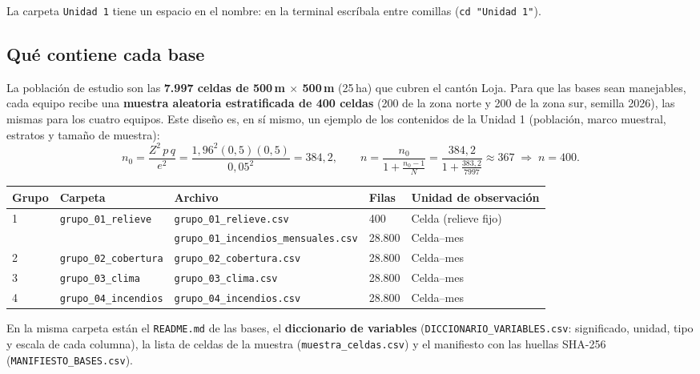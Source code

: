 \documentclass[11pt,a4paper]{article}
\begin{document}
La carpeta \texttt{Unidad 1} tiene un espacio en el nombre: en la terminal escríbala entre comillas (\texttt{cd "Unidad 1"}).

\subsection{Qué contiene cada base}

La población de estudio son las \textbf{7.997 celdas de 500\,m $\times$ 500\,m} (25\,ha) que cubren el cantón Loja. Para que las bases sean manejables, cada equipo recibe una \textbf{muestra aleatoria estratificada de 400 celdas} (200 de la zona norte y 200 de la zona sur, semilla 2026), las mismas para los cuatro equipos. Este diseño es, en sí mismo, un ejemplo de los contenidos de la Unidad 1 (población, marco muestral, estratos y tamaño de muestra):
\[
n_0=\frac{Z^2\,p\,q}{e^2}=\frac{1{,}96^2(0{,}5)(0{,}5)}{0{,}05^2}=384{,}2,
\qquad
n=\frac{n_0}{1+\frac{n_0-1}{N}}=\frac{384{,}2}{1+\frac{383{,}2}{7997}}\approx 367
\;\Rightarrow\; n=400 .
\]

\begin{center}
\footnotesize
\renewcommand{\arraystretch}{1.2}
\begin{tabularx}{\textwidth}{C{0.9cm}L{3.3cm}L{5.4cm}C{1.4cm}Y}
\toprule
\textbf{Grupo} & \textbf{Carpeta} & \textbf{Archivo} & \textbf{Filas} & \textbf{Unidad de observación} \\
 & \nolinkurl{grupo_01_relieve} & \nolinkurl{grupo_01_relieve.csv} & 400 & Celda (relieve fijo) \\
  &                              & \nolinkurl{grupo_01_incendios_mensuales.csv} & 28.800 & Celda--mes \\
2 & \nolinkurl{grupo_02_cobertura} & \nolinkurl{grupo_02_cobertura.csv} & 28.800 & Celda--mes \\
3 & \nolinkurl{grupo_03_clima} & \nolinkurl{grupo_03_clima.csv} & 28.800 & Celda--mes \\
4 & \nolinkurl{grupo_04_incendios} & \nolinkurl{grupo_04_incendios.csv} & 28.800 & Celda--mes \\
\bottomrule
\end{tabularx}
\end{center}

En la misma carpeta están el \texttt{README.md} de las bases, el \textbf{diccionario de variables} (\nolinkurl{DICCIONARIO_VARIABLES.csv}: significado, unidad, tipo y escala de cada columna), la lista de celdas de la muestra (\nolinkurl{muestra_celdas.csv}) y el manifiesto con las huellas SHA-256 (\nolinkurl{MANIFIESTO_BASES.csv}).
\end{document}
